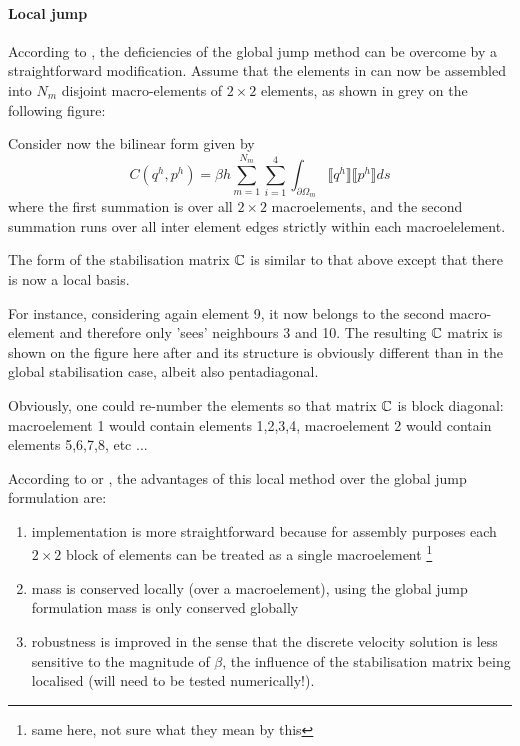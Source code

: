\vspace{.5cm}

\paragraph{Local jump}

According to \textcite{sike90}, the deficiencies of the global jump method can be overcome by a straightforward modification. Assume that the elements in can now be assembled into $N_m$ disjoint macro-elements
of $2\times 2$ elements, as shown in grey on the following figure:

\begin{center}

\end{center}

Consider now the bilinear form given by
\[
C(q^h,p^h) = \beta h \sum_{m=1}^{N_m} \sum_{i=1}^4 \int_{\partial \Omega_m} \llbracket q^h \rrbracket  \llbracket p^h \rrbracket ds
\]
where the first summation is over all $2\times 2$ macroelements,
and the second summation runs over all inter element edges strictly within each macroelelement.

The form of the stabilisation matrix ${\mathbb{C}}$ is similar to that above except that there is now a local basis.

For instance, considering again element 9, it now belongs to the second macro-element and therefore only 'sees' neighbours 3 and 10.
The resulting ${\mathbb{C}}$ matrix is shown on the figure here after and
its structure is obviously different than in the global stabilisation case, albeit also pentadiagonal.

\begin{center}

\end{center}

\begin{remark}
Obviously, one could re-number the elements so that matrix ${\mathbb{C}}$
is block diagonal: macroelement 1 would contain elements 1,2,3,4, macroelement 2 would contain elements 5,6,7,8, etc ... 
\end{remark}

According to \textcite{sike90} or \textcite{chke20}, the advantages of this local method over the global jump
formulation are:
\begin{enumerate}
\item implementation is more straightforward because for assembly purposes each $2\times 2$ block of elements can be treated as a single macroelement \footnote{same here, not sure what they mean by this}
\item mass is conserved locally (over a macroelement), using the global jump formulation mass is only conserved globally
\item robustness is improved in the sense that the discrete velocity solution is less sensitive to the magnitude of $\beta$, the influence of the stabilisation matrix being localised (will need to be tested numerically!). 
\end{enumerate}

